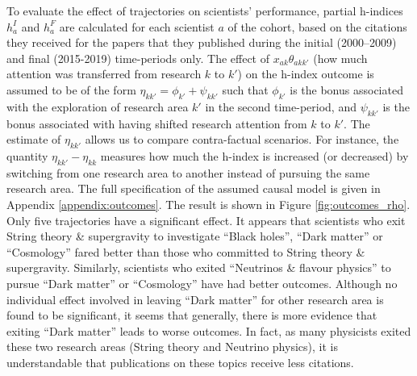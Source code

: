 \documentclass{article}
\begin{document}
To evaluate the effect of trajectories on scientists' performance, partial h-indices $h_a^{I}$ and $h_a^{F}$ are calculated for each scientist $a$ of the cohort, based on the citations they received for the papers that they published during the initial (2000--2009) and final (2015-2019) time-periods only. The effect of $x_{ak}\theta_{akk'}$ (how much attention was transferred from research $k$ to $k'$) on the h-index outcome is assumed to be of the form $\eta_{kk'} = \phi_{k'} + \psi_{kk'}$ such that $\phi_{k'}$ is the bonus associated with the exploration of research area $k'$ in the second time-period, and $\psi_{kk'}$ is the bonus associated with having shifted research attention from $k$ to $k'$. The estimate of $\eta_{kk'}$ allows us to compare contra-factual scenarios. For instance, the quantity $\eta_{kk'}-\eta_{kk}$ measures how much the h-index is increased (or decreased) by switching from one research area to another instead of pursuing the same research area. The full specification of the assumed causal model is given in Appendix \ref{appendix:outcomes}. The result is shown in Figure \ref{fig:outcomes_rho}. Only five trajectories have a significant effect. It appears that scientists who exit String theory \& supergravity to investigate ``Black holes'', ``Dark matter'' or ``Cosmology'' fared better than those who committed to String theory \& supergravity. Similarly, scientists who exited ``Neutrinos \& flavour physics'' to pursue ``Dark matter'' or ``Cosmology'' have had better outcomes. Although no individual effect involved in leaving ``Dark matter'' for other research area is found to be significant, it seems that generally, there is more evidence that exiting ``Dark matter'' leads to worse outcomes. In fact, as many physicists exited these two research areas (String theory and Neutrino physics), it is understandable that publications on these topics receive less citations. 
\end{document}
